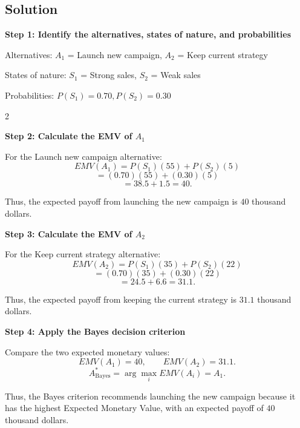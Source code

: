 	
	\subsection{Solution}
	
	\textbf{Step 1: Identify the alternatives, states of nature, and probabilities}
	
	Alternatives:
	$A_1$ = Launch new campaign,
	$A_2$ = Keep current strategy
	
	States of nature:
	$S_1$ = Strong sales,
	$S_2$ = Weak sales
	
	Probabilities:
	$
	P(S_1)=0.70,
	P(S_2)=0.30
	$
	
	\noindent
	\setlength{\columnseprule}{0.4pt}
	\newpage
	
	\begin{multicols}{2}
		\vspace{0pt}
		
		\textbf{Step 2: Calculate the EMV of $A_1$}
		
		For the Launch new campaign alternative:
		\[
		EMV(A_1)
		=
		P(S_1)(55)
		+
		P(S_2)(5)
		\]
		\[
		=
		(0.70)(55)
		+
		(0.30)(5)
		\]
		\[
		=
		38.5+1.5
		=
		40.
		\]
		
		Thus, the expected payoff from launching the new campaign is
		$40$ thousand dollars.
		
		\columnbreak
		
		\textbf{Step 3: Calculate the EMV of $A_2$}
		
		For the Keep current strategy alternative:
		\[
		EMV(A_2)
		=
		P(S_1)(35)
		+
		P(S_2)(22)
		\]
		\[
		=
		(0.70)(35)
		+
		(0.30)(22)
		\]
		\[
		=
		24.5+6.6
		=
		31.1.
		\]
		
		Thus, the expected payoff from keeping the current strategy is
		$31.1$ thousand dollars.
		
	\end{multicols}
	
	\setlength{\columnseprule}{0pt}
	
	\textbf{Step 4: Apply the Bayes decision criterion}
	
	Compare the two expected monetary values:
	$$
	EMV(A_1)=40,
	\qquad
	EMV(A_2)=31.1.
	$$
	$$
	A^*_{\mathrm{Bayes}}
	=
	\arg\max_i EMV(A_i)
	=
	A_1.
	$$
	
	Thus, the Bayes criterion recommends launching the new campaign because
	it has the highest Expected Monetary Value, with an expected payoff of
	$40$ thousand dollars.
	
